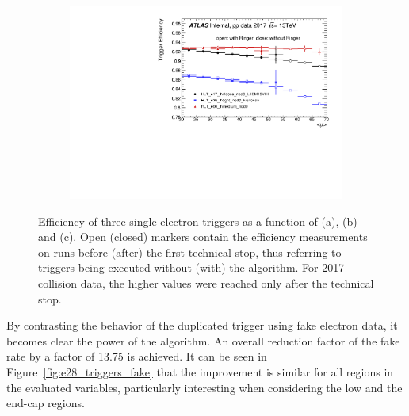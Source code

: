 \begin{figure}[h!tb]
\begin{center}
  \begin{subfigure}[c]{.59\textwidth}
  \centering
  \includegraphics[width=\textwidth]{sections/04_operation/figures/efficiencies/eff_EGAM1_e17_e26_e60_2017_before_and_after_ts1_mu.pdf}
  \caption{}%
  \end{subfigure}
  \caption{Efficiency of three single electron triggers as a function of
  \et (a), \eta (b) and \avgmu (c). Open (closed) markers contain
  the efficiency measurements on runs before (after) the first technical stop, thus referring to
  triggers being executed without (with) the \rnn{} algorithm. For 2017 collision data, the higher \avgmu{} values were reached only after the technical stop. 
  }%
  \label{fig:2017_ts1}
  \end{center}
\end{figure}


By contrasting the behavior of the duplicated trigger using fake electron data,
it becomes clear the power of the \rnn{} algorithm. An overall reduction factor of
the fake rate by a factor of 13.75 is achieved. It can be seen in
Figure~\ref{fig:e28_triggers_fake} that the improvement is similar for all
regions in the evaluated variables, particularly interesting when
considering the low \et{} and the end-cap regions.




